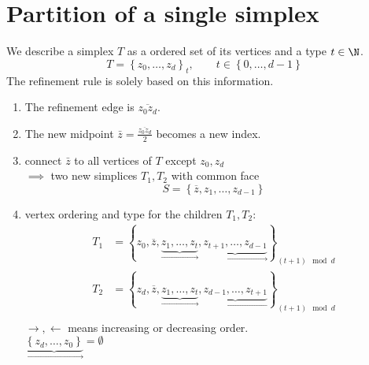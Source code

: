 \section{Partition of a single simplex}
\begin{definition}
	We describe a simplex $T$ as a ordered set of its vertices and a type $t\in \N$.
	\begin{equation*}
		T = \left\{z_{0}, \dots , z_{d}\right\}_{t}, \qquad t\in \left\{ 0,\dots ,d-1 \right\}
	\end{equation*}
	The refinement rule is solely based on this information.
	\begin{enumerate}[label = \arabic*)]
		\item The refinement edge is $\overline{z_{0}z_{d}}$.
		\item The new midpoint $\bar{z}= \frac{\overline{z_{0}z_{d}}}{2}$ becomes a new index.
		\item connect $\bar{z}$ to all vertices of $T$ except $z_{0},z_{d}$ \\
			$\implies$ two new simplices $T_{1},T_{2}$ with common face
			 \begin{equation*}
				S = \left\{\overline{z},z_{1},\dots ,z_{d-1} \right\}
			\end{equation*}
		\item vertex ordering and type for the children $T_{1},T_{2}$:
			\begin{align*}
				T_{1}&= \left\{ z_{0},\overline{z},\underbrace{z_{1},\dots ,z_{t}}_{\rightarrow},\underbrace{z_{t+1},\dots ,z_{d-1}}_{{\rightarrow}} \right\}_{(t+1)\mod d}\\
				T_{2}&= \left\{ z_{d},\overline{z},\underbrace{z_{1},\dots ,z_{t}}_{\rightarrow},\underbrace{z_{d-1},\dots ,z_{t+1}}_{{\leftarrow}} \right\}_{(t+1)\mod d}\\
			\end{align*}
		$\rightarrow, \leftarrow$ means increasing or decreasing order.	\\
		$\underbrace{\left\{z_{d},\dots ,z_{0}\right\} }_{\rightarrow} =\emptyset$		
	\end{enumerate}
\end{definition}
